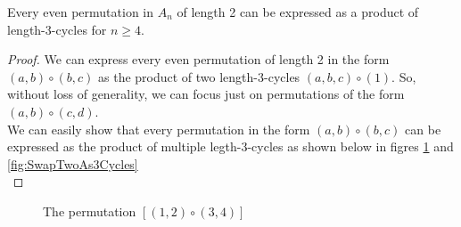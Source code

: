 \newpage

\begin{lemma}
    Every even permutation in $A_n$ of length 2 can be expressed 
    as a product of length-3-cycles for $n \geq 4$.
\end{lemma}
\begin{proof}
    We can express every even permutation of length 2 in the form $(a,b) \circ (b,c)$ 
    as the product of two length-3-cycles $(a,b,c) \circ (1)$. So, without loss of generality,
    we can focus just on permutations of the form $(a,b) \circ (c,d)$.\\

    We can easily show that every permutation in the form $(a,b) \circ (b,c)$ can be 
    expressed as the product of multiple legth-3-cycles as shown below in figres \ref{fig:SwapTwo} and 
    \ref{fig:SwapTwoAs3Cycles} \\
\end{proof} \vspace{0.2em}

\begin{figure}[H]
\label{fig:SwapTwo}
    \centering
    \caption{The permutation $[(1,2) \circ (3,4)]$ }

\end{figure}

